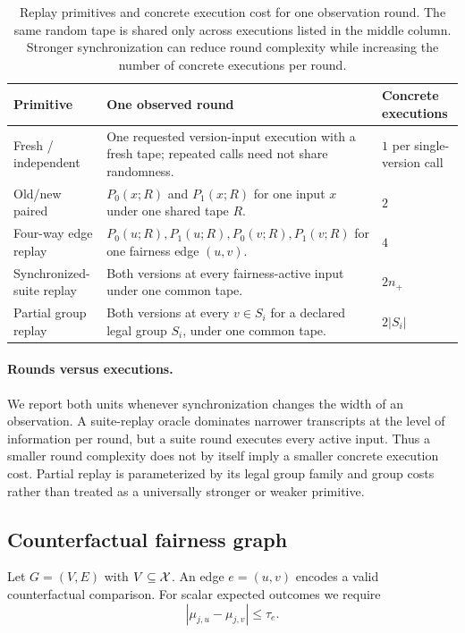 \begin{table}[t]
\centering
\caption{Replay primitives and concrete execution cost for one observation
round.  The same random tape is shared only across executions listed in the
middle column.  Stronger synchronization can reduce round complexity while
increasing the number of concrete executions per round.}
\label{tab:oracle-access}
\small
\begin{tabular}{@{}p{}p{}p{}@{}}
\toprule
Primitive & One observed round & Concrete executions \\
\midrule
Fresh / independent &
One requested version-input execution with a fresh tape; repeated calls need
not share randomness. &
$1$ per single-version call \\

Old/new paired &
$P_0(x;R)$ and $P_1(x;R)$ for one input $x$ under one shared tape $R$. &
$2$ \\

Four-way edge replay &
$P_0(u;R),P_1(u;R),P_0(v;R),P_1(v;R)$ for one fairness edge $(u,v)$. &
$4$ \\

Synchronized-suite replay &
Both versions at every fairness-active input under one common tape. &
$2n_+$ \\

Partial group replay &
Both versions at every $v\in S_i$ for a declared legal group $S_i$, under one
common tape. &
$2|S_i|$ \\
\bottomrule
\end{tabular}
\end{table}

\paragraph{Rounds versus executions.}
We report both units whenever synchronization changes the width of an
observation.  A suite-replay oracle dominates narrower transcripts at the level
of information per round, but a suite round executes every active input.  Thus a
smaller round complexity does not by itself imply a smaller concrete execution
cost.  Partial replay is parameterized by its legal group family and group
costs rather than treated as a universally stronger or weaker primitive.

\subsection{Counterfactual fairness graph}
Let $G=(V,E)$ with $V\subseteq\mathcal{X}$.  An edge $e=(u,v)$ encodes a valid
counterfactual comparison.  For scalar expected outcomes we require
\[
|\mu_{j,u}-\mu_{j,v}|\le\tau_e.
\]

